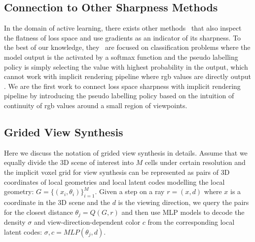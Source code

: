 \subsection{Connection to Other Sharpness Methods}
In the domain of active learning, there exists other methods~
\cite{keskar_large-batch_2017,ash_deep_2020,jiang_fantastic_2019,kim_saal_2023} that also inspect the flatness of loss space and use gradients as an indicator of its sharpness.
To the best of our knowledge, they~\cite{keskar_large-batch_2017,ash_deep_2020,jiang_fantastic_2019,kim_saal_2023} are focused on classification problems where the model output is the activated by a softmax function and the pseudo labelling policy is simply selecting the value with highest probability in the output, which cannot work with implicit rendering pipeline where rgb values are directly output .
We are the first work to connect loss space sharpness with implicit rendering pipeline by introducing the pseudo labelling policy based on the intuition of continuity of rgb values around a small region of viewpoints.

\subsection{Grided View Synthesis}
Here we discuss the notation of grided view synthesis in details.
Assume that we equally divide the 3D scene of interest into $M$ cells under certain resolution and the
implicit voxel grid for view synthesis can be represented as pairs of 3D coordinates of local geometries and local latent codes modelling the local geometry: $G=\{(x_i,\theta_i)\}_{i=1}^M$.
Given a step on a ray $r=(x,d)$ where $x$ is a coordinate in the 3D scene and the $d$ is the viewing direction, we query the pairs for the closest distance $\theta_j = Q(G,r)$ and then use MLP models to decode the density $\sigma$ and view-direction-dependent color $c$ from the corresponding local latent codes: $\sigma,c=MLP(\theta_j, d)$.

